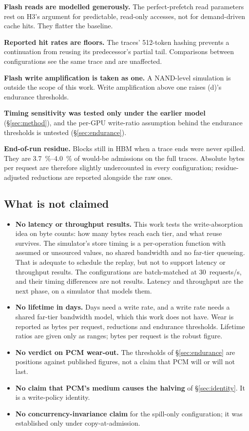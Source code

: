 \documentclass[conference]{IEEEtran}
\newcommand{\cfgd}{\textsf{(d)}}
\begin{document}
\textbf{Flash reads are modelled generously.} The perfect-prefetch read
parameters rest on H3's argument for predictable, read-only accesses, not for
demand-driven cache hits. They flatter the baseline.

\textbf{Reported hit rates are floors.} The traces' 512-token hashing prevents
a continuation from reusing its predecessor's partial tail. Comparisons between
configurations see the same trace and are unaffected.

\textbf{Flash write amplification is taken as one.} A NAND-level simulation is
outside the scope of this work. Write amplification above one raises \cfgd's
endurance thresholds.

\textbf{Timing sensitivity was tested only under the earlier model}
(\S\ref{sec:method}), and the per-GPU write-ratio assumption behind the
endurance thresholds is untested (\S\ref{sec:endurance}).

\textbf{End-of-run residue.} Blocks still in HBM when a trace ends were never
spilled. They are \SIrange{3.7}{4.0}{\percent} of would-be admissions on the
full traces. Absolute bytes per request are therefore slightly undercounted in
every configuration; residue-adjusted reductions are reported alongside the raw
ones.

\subsection{What is not claimed}\label{sec:notclaimed}
\begin{itemize}
  \item \textbf{No latency or throughput results.} This work tests the
        write-absorption idea on byte counts: how many bytes reach each tier,
        and what reuse survives. The simulator's store timing is a
        per-operation function with assumed or unsourced values, no shared
        bandwidth and no far-tier queueing. That is adequate to schedule the
        replay, but not to support latency or throughput results. The
        configurations are batch-matched at 30~requests/s, and their timing
        differences are not results. Latency and throughput are the next phase,
        on a simulator that models them.
  \item \textbf{No lifetime in days.} Days need a write rate, and a write rate
        needs a shared far-tier bandwidth model, which this work does not have.
        Wear is reported as bytes per request, reductions and endurance
        thresholds. Lifetime ratios are given only as ranges; bytes per request
        is the robust figure.
  \item \textbf{No verdict on PCM wear-out.} The thresholds of
        \S\ref{sec:endurance} are positions against published figures, not a
        claim that PCM will or will not last.
  \item \textbf{No claim that PCM's medium causes the halving} of
        \S\ref{sec:identity}. It is a write-policy identity.
  \item \textbf{No concurrency-invariance claim} for the spill-only
        configuration; it was established only under copy-at-admission.
\end{itemize}
\end{document}
